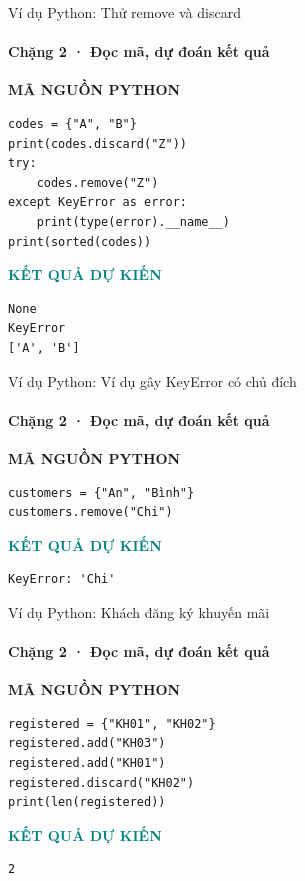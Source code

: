 \documentclass[aspectratio=169,10pt]{beamer}
\begin{document}
\begin{frame}[fragile,t]{Ví dụ Python: Thử remove và discard}
\framesubtitle{Chặng 2 · Đọc mã, dự đoán kết quả}
\vspace{-1mm}
{\small\color{muted}\textbf{MÃ NGUỒN PYTHON}}\par\vspace{1mm}
\begin{Verbatim}[fontsize=\scriptsize,frame=single,framesep=4mm,rulecolor=\color{teal!35},breaklines=true]
codes = {"A", "B"}
print(codes.discard("Z"))
try:
    codes.remove("Z")
except KeyError as error:
    print(type(error).__name__)
print(sorted(codes))
\end{Verbatim}
\vspace{1mm}\textcolor{teal}{\scriptsize\textbf{KẾT QUẢ DỰ KIẾN}}
\begin{Verbatim}[fontsize=\scriptsize,breaklines=true]
None
KeyError
['A', 'B']
\end{Verbatim}

\end{frame}

\begin{frame}[fragile,t]{Ví dụ Python: Ví dụ gây KeyError có chủ đích}
\framesubtitle{Chặng 2 · Đọc mã, dự đoán kết quả}
\vspace{-1mm}
{\small\color{muted}\textbf{MÃ NGUỒN PYTHON}}\par\vspace{1mm}
\begin{Verbatim}[fontsize=\scriptsize,frame=single,framesep=4mm,rulecolor=\color{teal!35},breaklines=true]
customers = {"An", "Bình"}
customers.remove("Chi")
\end{Verbatim}
\vspace{1mm}\textcolor{teal}{\scriptsize\textbf{KẾT QUẢ DỰ KIẾN}}
\begin{Verbatim}[fontsize=\scriptsize,breaklines=true]
KeyError: 'Chi'
\end{Verbatim}

\end{frame}

\begin{frame}[fragile,t]{Ví dụ Python: Khách đăng ký khuyến mãi}
\framesubtitle{Chặng 2 · Đọc mã, dự đoán kết quả}
\vspace{-1mm}
{\small\color{muted}\textbf{MÃ NGUỒN PYTHON}}\par\vspace{1mm}
\begin{Verbatim}[fontsize=\scriptsize,frame=single,framesep=4mm,rulecolor=\color{teal!35},breaklines=true]
registered = {"KH01", "KH02"}
registered.add("KH03")
registered.add("KH01")
registered.discard("KH02")
print(len(registered))
\end{Verbatim}
\vspace{1mm}\textcolor{teal}{\scriptsize\textbf{KẾT QUẢ DỰ KIẾN}}
\begin{Verbatim}[fontsize=\scriptsize,breaklines=true]
2
\end{Verbatim}

\end{frame}
\end{document}
